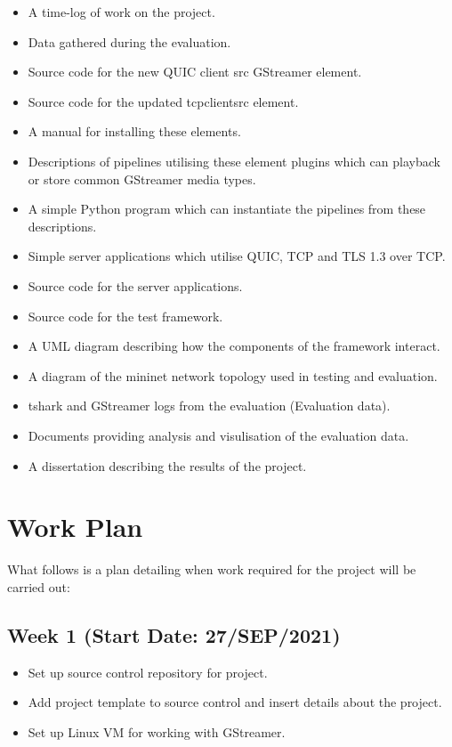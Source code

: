 \documentclass[11pt]{article}
\begin{document}
\begin{itemize}
    \item A time-log of work on the project.
    \item Data gathered during the evaluation.
    \item Source code for the new QUIC client src GStreamer element.
    \item Source code for the updated tcpclientsrc element.
    \item A manual for installing these elements.
    \item Descriptions of pipelines utilising these element plugins which can playback or store common GStreamer media types.
    \item A simple Python program which can instantiate the pipelines from these descriptions.
    \item Simple server applications which utilise QUIC, TCP and TLS 1.3 over TCP.
    \item Source code for the server applications.
    \item Source code for the test framework.
    \item A UML diagram describing how the components of the framework interact.
    \item A diagram of the mininet network topology used in testing and evaluation.
    \item tshark and GStreamer logs from the evaluation (Evaluation data).
    \item Documents providing analysis and visulisation of the evaluation data.
    \item A dissertation describing the results of the project.
\end{itemize}


\section{Work Plan}
What follows is a plan detailing when work required for the project will be carried out:

\subsection{Week 1 (Start Date: 27/SEP/2021)}
\begin{itemize}
    \item Set up source control repository for project.
    \item Add project template to source control and insert details about the project.
    \item Set up Linux VM for working with GStreamer.
\end{itemize}
\end{document}
